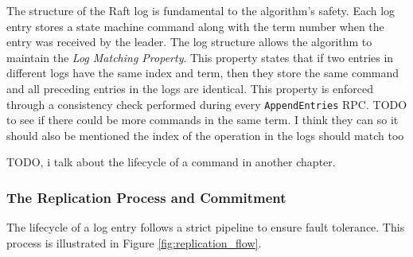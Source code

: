 The structure of the Raft log is fundamental to the algorithm's safety.
Each log entry stores a state machine command along with the term number when the entry was received by the leader.
The log structure allows the algorithm to maintain the \textit{Log Matching Property}. This property states that if two entries in different logs have the same index and term, then they store the same command and all preceding entries in the logs are identical. This property is enforced through a consistency check performed during every \texttt{AppendEntries} RPC.
TODO to see if there could be more commands in the same term. I think they can so it should also be mentioned the index of the operation in the logs should match too

TODO, i talk about the lifecycle of a command in another chapter.
\subsubsection{The Replication Process and Commitment}
The lifecycle of a log entry follows a strict pipeline to ensure fault tolerance. This process is illustrated in Figure \ref{fig:replication_flow}.

